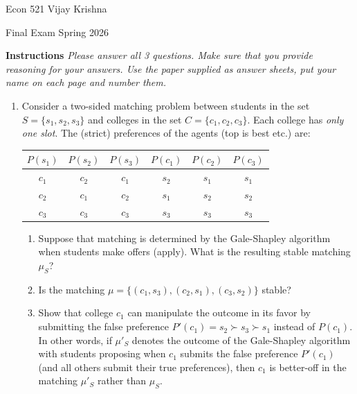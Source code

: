 \documentclass[11pt]{article}
\begin{document}
Econ 521 \hfill Vijay Krishna

Final Exam \hfill Spring 2026

\vspace{1.2em}

\textbf{Instructions} \emph{Please answer all 3 questions. Make sure that you provide reasoning for your answers. Use the paper supplied as answer sheets, put your name on each page and number them.}

\vspace{0.6em}

\begin{enumerate}[itemsep=1em]

  \item Consider a two-sided matching problem between students in the set $S = \{s_1, s_2, s_3\}$ and colleges in the set $C = \{c_1, c_2, c_3\}$. Each college has \emph{only one slot}. The (strict) preferences of the agents (top is best etc.) are:
    \begin{center}
    \begin{tabular}{c|c|c||c|c|c}
      $P(s_1)$ & $P(s_2)$ & $P(s_3)$ & $P(c_1)$ & $P(c_2)$ & $P(c_3)$ \\
      \hline
      $c_1$ & $c_2$ & $c_1$ & $s_2$ & $s_1$ & $s_1$ \\
      $c_2$ & $c_1$ & $c_2$ & $s_1$ & $s_2$ & $s_2$ \\
      $c_3$ & $c_3$ & $c_3$ & $s_3$ & $s_3$ & $s_3$
    \end{tabular}
    \end{center}
    \begin{enumerate}[label=(\alph*), itemsep=0.4em, topsep=0.4em]
      \item Suppose that matching is determined by the Gale-Shapley algorithm when students make offers (apply). What is the resulting stable matching $\mu_S$?
      \item Is the matching $\mu = \{(c_1, s_3), (c_2, s_1), (c_3, s_2)\}$ stable?
      \item Show that college $c_1$ can manipulate the outcome in its favor by submitting the false preference $P'(c_1) = s_2 \succ s_3 \succ s_1$ instead of $P(c_1)$. In other words, if $\mu'_S$ denotes the outcome of the Gale-Shapley algorithm with students proposing when $c_1$ submits the false preference $P'(c_1)$ (and all others submit their true preferences), then $c_1$ is better-off in the matching $\mu'_S$ rather than $\mu_S$.
    \end{enumerate}


\end{enumerate}
\end{document}

